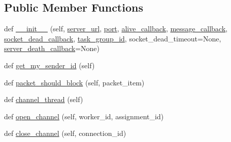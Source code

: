 \subsection*{Public Member Functions}
\begin{DoxyCompactItemize}
\item 
def \hyperlink{classparlai_1_1mturk_1_1core_1_1legacy__2018_1_1socket__manager_1_1SocketManager_ac4a8060782edd077f684e1f90a04f75d}{\+\_\+\+\_\+init\+\_\+\+\_\+} (self, \hyperlink{classparlai_1_1mturk_1_1core_1_1legacy__2018_1_1socket__manager_1_1SocketManager_aac5bb60353aa8fed36a831b55d805683}{server\+\_\+url}, \hyperlink{classparlai_1_1mturk_1_1core_1_1legacy__2018_1_1socket__manager_1_1SocketManager_aa80ae69b3f44a462d996a05a85b49cf6}{port}, \hyperlink{classparlai_1_1mturk_1_1core_1_1legacy__2018_1_1socket__manager_1_1SocketManager_ababcefebfe2b2e917d08ff38cbba85e0}{alive\+\_\+callback}, \hyperlink{classparlai_1_1mturk_1_1core_1_1legacy__2018_1_1socket__manager_1_1SocketManager_acc942e6c0c373bcae320a0429dbae3cc}{message\+\_\+callback}, \hyperlink{classparlai_1_1mturk_1_1core_1_1legacy__2018_1_1socket__manager_1_1SocketManager_adef2c46d45c694ae1b0ec13d7c126211}{socket\+\_\+dead\+\_\+callback}, \hyperlink{classparlai_1_1mturk_1_1core_1_1legacy__2018_1_1socket__manager_1_1SocketManager_a7766f5aafcb9e27c5043a141e247b770}{task\+\_\+group\+\_\+id}, socket\+\_\+dead\+\_\+timeout=None, \hyperlink{classparlai_1_1mturk_1_1core_1_1legacy__2018_1_1socket__manager_1_1SocketManager_a77c85a9f4cb4513e5a5ae9399fa133b8}{server\+\_\+death\+\_\+callback}=None)
\item 
def \hyperlink{classparlai_1_1mturk_1_1core_1_1legacy__2018_1_1socket__manager_1_1SocketManager_a8fd31d452501b480aad260eebaf51c8e}{get\+\_\+my\+\_\+sender\+\_\+id} (self)
\item 
def \hyperlink{classparlai_1_1mturk_1_1core_1_1legacy__2018_1_1socket__manager_1_1SocketManager_a8793f6a47fa15f3b76b3660240563492}{packet\+\_\+should\+\_\+block} (self, packet\+\_\+item)
\item 
def \hyperlink{classparlai_1_1mturk_1_1core_1_1legacy__2018_1_1socket__manager_1_1SocketManager_a762590d50448509a5986c27a60dfea1a}{channel\+\_\+thread} (self)
\item 
def \hyperlink{classparlai_1_1mturk_1_1core_1_1legacy__2018_1_1socket__manager_1_1SocketManager_a736cdf9b5be6d3fee7f88cf7893b56f0}{open\+\_\+channel} (self, worker\+\_\+id, assignment\+\_\+id)
\item 
def \hyperlink{classparlai_1_1mturk_1_1core_1_1legacy__2018_1_1socket__manager_1_1SocketManager_aba8ba15b13ecbf57b9bc9ef15d9ba620}{close\+\_\+channel} (self, connection\+\_\+id)

\end{DoxyCompactItemize}
